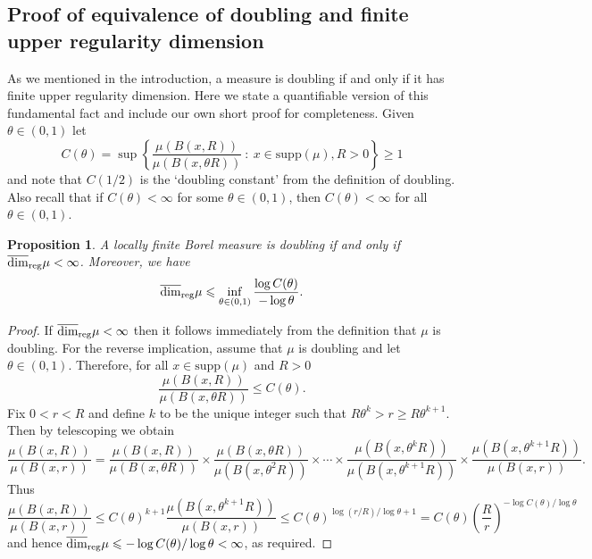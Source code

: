 \documentclass[12pt]{amsart}
\numberwithin{equation}{section}
\newtheorem{prop}[thm]{Proposition}
\renewcommand{\ge}{\geqslant}
\renewcommand{\le}{\leqslant}
\renewcommand{\geq}{\geqslant}
\renewcommand{\leq}{\leqslant}
\renewcommand{\r}{\overline{\dim}_{\textup{reg}} \mu}
\begin{document}
\subsection{Proof of equivalence of doubling and finite upper regularity dimension} \label{doublingproof}

As we mentioned in the introduction, a measure is doubling if and only if it has finite upper regularity dimension. Here we state a quantifiable version of this fundamental fact and include our own short proof for completeness.  Given $\theta \in (0,1)$ let
\[
C(\theta) = \sup \left\{ \frac{\mu(B(x,R))}{\mu(B(x,\theta R))} \ : \ x \in \text{supp}(\mu), R>0 \right\} \geq 1
\]
and note that $C(1/2)$ is the `doubling constant' from the definition of doubling.  Also recall that if $C(\theta) < \infty$ for some $\theta \in (0,1)$, then  $C(\theta) < \infty$ for all $\theta \in (0,1)$.

\begin{prop}\label{doubling2}
A locally finite Borel measure is doubling if and only if $\r<\infty$.  Moreover, we have
\[
\r \le \inf_{\theta \in (0,1)} \frac{ \log C(\theta)}{ - \log \theta}.
\]
\end{prop}


\begin{proof}
If $\r <\infty$ then it follows immediately from the definition that $\mu$ is doubling.  For the reverse implication, assume that $\mu$ is doubling and let $\theta \in (0,1)$.  Therefore, for all $x \in \text{supp}(\mu)$ and $R>0$
\[
\frac{\mu(B(x,R))}{\mu(B(x,\theta R))} \le C(\theta).
\]
Fix  $0< r < R$ and  define $k$ to be the unique integer such that $R\theta^k > r \ge R\theta^{k+1}$. Then by telescoping we obtain
\[
\frac{\mu(B(x,R))}{\mu(B(x,r))} = \frac{\mu(B(x,R))}{\mu(B(x,\theta R))} \times \frac{\mu(B(x,\theta R))}{\mu(B(x,\theta^2 R))} \times\cdots \times \frac{\mu(B(x,\theta^k R))}{\mu(B(x,\theta^{k+1}R))} \times \frac{\mu(B(x,\theta^{k+1}R))}{\mu(B(x,r))}.
\]
Thus 
\[
\frac{\mu(B(x,R))}{\mu(B(x,r))} \le C(\theta)^{k+1}  \frac{\mu(B(x,\theta^{k+1}R))}{\mu(B(x,r))} \le C(\theta)^{\log(r/R) / \log \theta+1} = C(\theta) \left(\frac{R}{r} \right)^{-\log C(\theta) / \log \theta}
\]
and hence $\r \leq -\log C(\theta) / \log \theta < \infty$, as required.
\end{proof}
\end{document}
